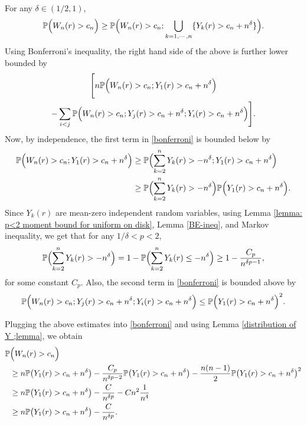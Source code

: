 \documentclass[9pt,a4paper,reqno]{amsart}
\theoremstyle{mine}
\theoremstyle{definition}
\theoremstyle{remark}
\begin{document}
For any $\delta \in (1/2, 1)$,  
    \begin{align*}
        \mathbb{P}\Bigl(  W_n(r) > c_n \Bigr) \geq  \mathbb{P}\Bigl(  W_n(r) > c_n ; \bigcup_{k=1,\cdots,n} \{Y_k(r) > c_n+ n^{\delta}\} \Bigr).    
    \end{align*}
    Using Bonferroni's inequality, the right hand side of the above is further lower bounded by 
    \begin{multline}\label{bonferroni}
        \Bigg[ n \mathbb{P}\Bigl( W_n(r)> c_n ; Y_1(r) > c_n+ n^{\delta} \Bigr) \\
        - \sum_{i <j} \mathbb{P}\Bigl(  W_n(r) > c_n ; Y_j(r) > c_n+ n^{\delta}; Y_i(r) > c_n+ n^{\delta} \Bigr) \Bigg].
    \end{multline}
    Now, by independence, the first term in \eqref{bonferroni} is bounded below by
    \begin{align*}
        \mathbb{P}\Bigl( W_n(r)> c_n ; Y_1(r) > c_n+ n^{\delta} \Bigr) &\geq \mathbb{P}\Bigl(  \sum_{k=2}^n  Y_k(r) > -n^{\delta} ; Y_1(r) > c_n+ n^{\delta} \Bigr)\\
        &\geq \mathbb{P}\Bigl(  \sum_{k=2}^n  Y_k(r) > -n^{\delta} \Bigr) \mathbb{P}\Bigl( Y_1(r) > c_n+ n^{\delta} \Bigr).
    \end{align*}
    Since $ Y_k(r)$ are mean-zero independent random variables, using Lemma \ref{lemma: p<2 moment bound for uniform on disk}, Lemma \ref{BE-ineq}, and Markov inequality, we get that for any $1/\delta < p<2$,   
    \begin{align*}
        \mathbb{P}\Bigl(  \sum_{k=2}^n  Y_k(r) > -n^{\delta} \Bigr) =1-  \mathbb{P}\Bigl(  \sum_{k=2}^n  Y_k(r) \leq -n^{\delta} \Bigr) \geq 1- \frac{C_p}{n^{\delta p - 1}},
    \end{align*}
    for some constant $C_p$. Also, the second term in \eqref{bonferroni} is bounded above by 
    \begin{align*}
        \mathbb{P}\Bigl(  W_n(r) > c_n ; Y_j(r) > c_n+ n^{\delta}; Y_i(r) > c_n+ n^{\delta} \Bigr) \leq \mathbb{P}\Bigl( Y_1(r) > c_n+ n^{\delta} \Bigr)^2.
    \end{align*}
    
    Plugging the above estimates into \eqref{bonferroni} and using Lemma \ref{distribution of Y ;lemma}, we obtain
    \begin{align*}
         \mathbb{P}&\Bigl(  W_n(r) > c_n \Bigr) \\&\geq  n \mathbb{P}\bigl( Y_1(r) > c_n + n^{\delta} \bigr)- \frac{C_p}{n^{\delta p -2 }}\mathbb{P}\bigl( Y_1(r) > c_n + n^{\delta} \bigr) - \frac{n(n-1)}{2}\mathbb{P}\bigl( Y_1(r) > c_n + n^{\delta} \bigr)^2\\
        & \geq  n \mathbb{P}\bigl( Y_1(r) > c_n + n^{\delta} \bigr)- \frac{C}{n^{\delta p}} - C n^2 \frac{1}{n^4}\\
        & \geq  n \mathbb{P}\bigl( Y_1(r) > c_n + n^{\delta} \bigr)- \frac{C}{n^{\delta p}}.\\
    \end{align*}
    
\end{document}
